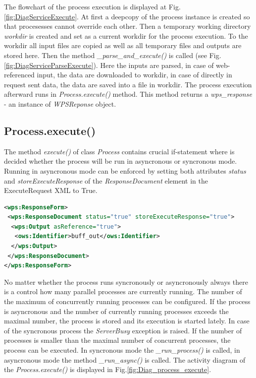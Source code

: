 \documentclass[12pt,a4paper]{article}
\begin{document}
The flowchart of the process execution is displayed at Fig. \ref{fig:DiagServiceExecute}. 
At first a deepcopy of the process instance is created so that procesesses cannot override each other. Then a temporary working directory \textit{workdir} is created and set as a current workdir for the process execution. To the workdir all input files are
copied as well as all temporary files and outputs are stored here. Then the method \textit{\_parse\_and\_execute()} is called (see
Fig. \ref{fig:DiagServiceParseExecute}). Here the inputs are parsed, in case of web-referenced input, the data are downloaded to workdir, in case of directly in request sent data, the data are saved into a file in workdir. The process execution afterward runs in \textit{Process.execute()} method. This method returns a \textit{wps\_response} - an instance of \textit{WPSReponse} object.

\subsection{Process.execute()}
The method \textit{execute()} of class \textit{Process} contains crucial if-statement where is decided whether the process will be
run in asyncronous or syncronous mode. Running in asyncronous mode can be enforced by setting both attributes \textit{status} and \textit{storeExecuteResponse} of the \textit{ResponseDocument} element in the ExecuteRequest XML to True.

\bigskip
\begin{lstlisting}[basicstyle=\small,caption={ReponseForm element of ExecuteRequest XML},language=XML,label={lst:Execute_ResponseForm}]
<wps:ResponseForm>
 <wps:ResponseDocument status="true" storeExecuteResponse="true">
  <wps:Output asReference="true">
   <ows:Identifier>buff_out</ows:Identifier>
  </wps:Output>
 </wps:ResponseDocument>
</wps:ResponseForm>
\end{lstlisting}
\bigskip 

No matter whether the process runs syncronously or asyncronously always there is a control how many parallel processes are currently
running. The number of the maximum of concurrently running processes can be configured. If the process is asyncronous and the number of currently running processes exceeds the maximal number, the process is stored and its execution is started lately. In case of the syncronous process the \textit{ServerBusy} exception is raised. If the number of processes is smaller than the maximal number of 
concurrent processes, the process can be executed. In syncronous mode the \textit{\_run\_process()} is called, in asyncronous mode the method \textit{\_run\_async()} is called. The activity diagram of the \textit{Process.execute()} is displayed in Fig.\ref{fig:Diag_process_execute}.
\end{document}
